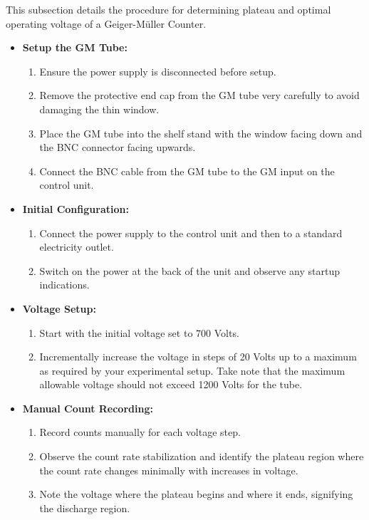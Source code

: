 \documentclass[11pt]{article}
\begin{document}
	This subsection details the procedure for determining plateau and optimal operating voltage of a Geiger-Müller Counter.
	\begin{itemize}
		\item \textbf{Setup the GM Tube:}
		\begin{enumerate}
			\item Ensure the power supply is disconnected before setup.
			\item Remove the protective end cap from the GM tube very carefully to avoid damaging the thin window.
			\item Place the GM tube into the shelf stand with the window facing down and the BNC connector facing upwards.
			\item Connect the BNC cable from the GM tube to the GM input on the control unit.
		\end{enumerate}
		
		\item \textbf{Initial Configuration:}
		\begin{enumerate}
			\item Connect the power supply to the control unit and then to a standard electricity outlet.
			\item Switch on the power at the back of the unit and observe any startup indications.
		\end{enumerate}
		
		\item \textbf{Voltage Setup:}
		\begin{enumerate}
			\item Start with the initial voltage set to 700 Volts.
			\item Incrementally increase the voltage in steps of 20 Volts up to a maximum as required by your experimental setup. Take note that the maximum allowable voltage should not exceed 1200 Volts for the tube.
		\end{enumerate}
		
		\item \textbf{Manual Count Recording:}
		\begin{enumerate}
			\item Record counts manually for each voltage step.
			\item Observe the count rate stabilization and identify the plateau region where the count rate changes minimally with increases in voltage.
			\item Note the voltage where the plateau begins and where it ends, signifying the discharge region.
		\end{enumerate}
		

\end{itemize}
\end{document}
